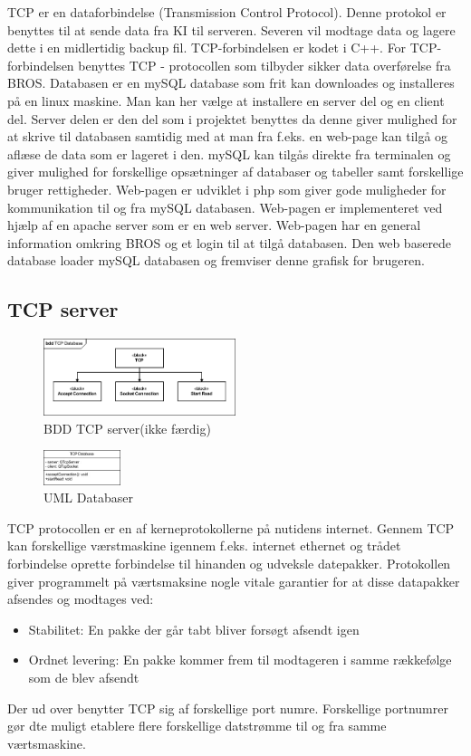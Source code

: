 TCP er en dataforbindelse (Transmission Control Protocol). Denne protokol er benyttes til at sende data fra KI til serveren. Severen vil modtage data og lagere dette i en midlertidig backup fil. TCP-forbindelsen er kodet i C++.
For TCP-forbindelsen benyttes TCP - protocollen som tilbyder sikker data overførelse fra BROS.
Databasen er en mySQL database som frit kan downloades og installeres på en linux maskine. Man kan her vælge at installere en server del og en client del. Server delen er den del som i projektet benyttes da denne giver mulighed for at skrive til databasen samtidig med at man fra f.eks. en web-page kan tilgå og aflæse de data som er lageret i den. mySQL kan tilgås direkte fra terminalen og giver mulighed for forskellige opsætninger af databaser og tabeller samt forskellige bruger rettigheder.
Web-pagen er udviklet i php som giver gode muligheder for kommunikation til og fra mySQL databasen. Web-pagen er implementeret ved hjælp af en apache server som er en web server. Web-pagen har en general information omkring BROS og et login til at tilgå databasen. Den web baserede database loader mySQL databasen og fremviser denne grafisk for brugeren.

\subsection{TCP server}
\begin{figure}[htbp]
	\centering
	\includegraphics[width=0.5\textwidth]{billeder/bdd_TCP_server}
	\caption{BDD TCP server(ikke færdig)}
	\label{fig:bdd_TCP_server}
\end{figure}

\begin{figure}[htbp]
	\centering
	\includegraphics[width=0.2\textwidth]{billeder/uml_database}
	\caption{UML Databaser}
	\label{fig:uml_database}
\end{figure}

TCP protocollen er en af kerneprotokollerne på nutidens internet. Gennem TCP kan forskellige værstmaskine igennem f.eks. internet ethernet og trådet forbindelse oprette forbindelse til hinanden og udveksle datepakker. Protokollen giver programmelt på værtsmaksine nogle vitale garantier for at disse datapakker afsendes og modtages ved:
\begin{itemize}
	\item Stabilitet: En pakke der går tabt bliver forsøgt afsendt igen
	\item Ordnet levering: En pakke kommer frem til modtageren i samme rækkefølge som de blev afsendt
\end{itemize}
Der ud over benytter TCP sig af forskellige port numre. Forskellige portnumrer gør dte muligt etablere flere forskellige datstrømme til og fra samme værtsmaskine.

